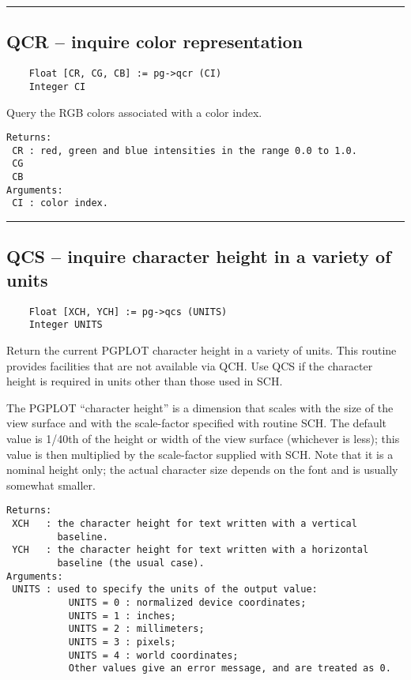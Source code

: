 \hrule

\subsection*{QCR -- inquire color representation }

\begin{verbatim}
    Float [CR, CG, CB] := pg->qcr (CI)
    Integer CI
\end{verbatim}

Query the RGB colors associated with a color index.

\begin{verbatim}
Returns:
 CR : red, green and blue intensities in the range 0.0 to 1.0. 
 CG
 CB
Arguments:
 CI : color index.
\end{verbatim}

\hrule

\subsection*{QCS -- inquire character height in a variety of units }

\begin{verbatim}
    Float [XCH, YCH] := pg->qcs (UNITS)
    Integer UNITS
\end{verbatim}

Return the current PGPLOT character height in a variety of units.
This routine provides facilities that are not available via QCH.  Use
QCS if the character height is required in units other than those used
in SCH.

The PGPLOT ``character height'' is a dimension that scales with the
size of the view surface and with the scale-factor specified with
routine SCH.  The default value is 1/40th of the height or width of
the view surface (whichever is less); this value is then multiplied by
the scale-factor supplied with SCH.  Note that it is a nominal height
only; the actual character size depends on the font and is usually
somewhat smaller.

\begin{verbatim}
Returns:
 XCH   : the character height for text written with a vertical
         baseline. 
 YCH   : the character height for text written with a horizontal
         baseline (the usual case). 
Arguments:
 UNITS : used to specify the units of the output value:
           UNITS = 0 : normalized device coordinates;
           UNITS = 1 : inches;
           UNITS = 2 : millimeters;
           UNITS = 3 : pixels;
           UNITS = 4 : world coordinates;
           Other values give an error message, and are treated as 0.
\end{verbatim}

